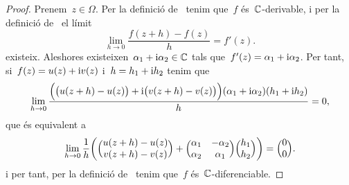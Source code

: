 \documentclass[../Apunts.tex]{subfiles}
\begin{document}
    \begin{proof}
        Prenem~\(z\in\Omega\).
        Per la definició de~ tenim que~\(f\)
        és~\(\mathbb{C}\)-derivable, i per la definició de~
        el límit
        \begin{equation*}
            \lim_{h\to0}\frac{f(z+h)-f(z)}{h} = f'(z).
        \end{equation*}
        existeix.
        Aleshores existeixen~\(\alpha_{1}+\mathrm{i}\alpha_{2}\in\mathbb{C}\) tals
        que~\(f'(z)=\alpha_{1}+\mathrm{i}\alpha_{2}\).
        Per tant, si~\(f(z)=u(z)+\mathrm{i} v(z)\) i~\(h=h_{1}+\mathrm{i} h_{2}\) tenim que
        \begin{equation*}
            \lim_{h\to0}\frac{\Bigl(\bigl(u(z+h)-u(z)\bigr)
            +\mathrm{i}\bigl(v(z+h)-v(z)\bigr)\Bigr)(\alpha_{1}+\mathrm{i}\alpha_{2})
            (h_{1}+\mathrm{i} h_{2})}{h} = 0,
        \end{equation*}
        que és equivalent a
        \begin{equation*}
            \lim_{h\to0}\frac{1}{h}\biggl(\Bigl(\begin{matrix}
                u(z+h)-u(z) \\
                v(z+h)-v(z)
            \end{matrix}
            \Bigr)+\Bigl(\begin{matrix}
                \alpha_{1} & -\alpha_{2} \\
                \alpha_{2} & \alpha_{1}
            \end{matrix}\Bigr)\Bigl(\begin{matrix}
                h_{1} \\
                h_{2}
            \end{matrix}\Bigr)\biggr)
            =\Bigl(\begin{matrix}
                0 \\
                0
            \end{matrix}\Bigr).
        \end{equation*}
        i per tant, per la definició de~ tenim que~\(f\) és~\(\mathbb{C}\)-diferenciable.
    \end{proof}
\end{document}
